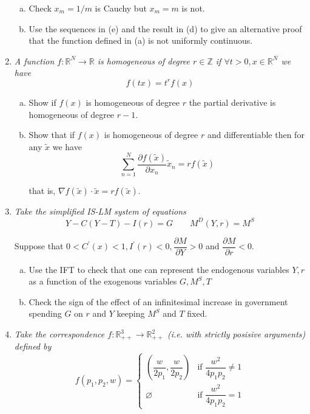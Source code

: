 \documentclass{article}
\begin{document}
\begin{enumerate}[1.]
{\begin{enumerate}[a)]
      \item Check $x_m = 1 / m$ is Cauchy but $x_m = m$ is not.

      \item Use the sequences in (e) and the result in (d) to give an alternative proof that the function defined in (a) is not uniformly continuous.
    \end{enumerate}
  }

  \item {\itshape
    A function $f: \mathbb{R}^N \to \mathbb{R}$ is homogeneous of degree $r \in \mathbb{Z}$ if $\forall t > 0, x \in \mathbb{R}^N$ we have
    \[
      f(tx) = t^r f(x)
    \]

    \begin{enumerate}[a)]
      \item Show if $f(x)$ is homogeneous of degree $r$ the partial derivative is homogeneous of degree $r - 1$.

      \item Show that if $f(x)$ is homogeneous of degree $r$ and differentiable  then for any $\widetilde{x}$ we have
        \[
          \sum^{N}_{n = 1} \dfrac{\partial f(\widetilde{x})}{\partial x_n} \widetilde{x}_n = r f(\widetilde{x})
        \]

      that is, $\nabla f(\widetilde{x}) \cdot \widetilde{x} = r f(\widetilde{x})$.\textit{}
    \end{enumerate}
  }

  \item {\itshape
    Take the simplified IS-LM system of equations
    \[
      Y - C(Y - T) - I(r) = G
      \quad\quad
      M^D(Y, r) = M^S
    \]

    Suppose that $0 < C^\prime(x) < 1, I^\prime(r) < 0, \dfrac{\partial M}{\partial Y} > 0$ and $\dfrac{\partial M}{\partial r} < 0$.
    \begin{enumerate}[a)]
      \item Use the IFT to check that one can represent the endogenous variables $Y, r$ as a function of the exogenous variables $G, M^S, T$

      \item Check the sign of the effect of an infinitesimal increase in government spending $G$ on $r$ and $Y$ keeping $M^S$ and $T$ fixed.
    \end{enumerate}
  }

  \item {\itshape
    Take the correspondence $f: \mathbb{R}^3_{++} \to \mathbb{R}^2_{++}$ (i.e. with strictly posisive arguments) defined by
    \[
      f(p_1, p_2, w)
      =
      \begin{cases}
        \left(\dfrac{w}{2p_1}, \dfrac{w}{2 p_2}\right)
          & \text{if } \dfrac{w^2}{4 p_1 p_2} \ne 1 \\[6pt]
        \varnothing
          & \text{if } \dfrac{w^2}{4 p_1 p_2} = 1
      \end{cases}
    \]

}
\end{enumerate}
\end{document}
